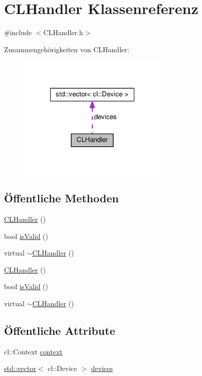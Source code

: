 \hypertarget{classCLHandler}{\section{C\-L\-Handler Klassenreferenz}
\label{classCLHandler}
}


{\ttfamily \#include $<$C\-L\-Handler.\-h$>$}



Zusammengehörigkeiten von C\-L\-Handler\-:
\nopagebreak
\begin{figure}[H]
\begin{center}
\leavevmode
\includegraphics[width=204pt]{classCLHandler__coll__graph}
\end{center}
\end{figure}
\subsection*{Öffentliche Methoden}
\begin{DoxyCompactItemize}
\item 
\hyperlink{classCLHandler_a0755561464f255fe46df924bbe83b200}{C\-L\-Handler} ()
\item 
bool \hyperlink{classCLHandler_aa43428623da161d648d5e7e127cb6839}{is\-Valid} ()
\item 
virtual \hyperlink{classCLHandler_af6e3d327900227be448249478f131024}{$\sim$\-C\-L\-Handler} ()
\item 
\hyperlink{classCLHandler_a0755561464f255fe46df924bbe83b200}{C\-L\-Handler} ()
\item 
bool \hyperlink{classCLHandler_aa43428623da161d648d5e7e127cb6839}{is\-Valid} ()
\item 
virtual \hyperlink{classCLHandler_ac144160038db8b8eb2a4b2820c221dbf}{$\sim$\-C\-L\-Handler} ()
\end{DoxyCompactItemize}
\subsection*{Öffentliche Attribute}
\begin{DoxyCompactItemize}
\item 
cl\-::\-Context \hyperlink{classCLHandler_af9c48260d7411e0657d6d991d99b32e0}{context}
\item 
\hyperlink{classstd_1_1vector}{std\-::vector}$<$ cl\-::\-Device $>$ \hyperlink{classCLHandler_ac09363db47da2dc8bce9c5f6352e02c1}{devices}
\end{DoxyCompactItemize}
